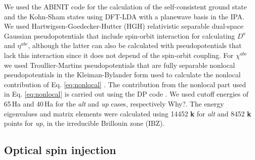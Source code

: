 \documentclass[pss]{wiley2sp} %
\begin{document}
We used the ABINIT code \cite{torrentCMS08} for the calculation of the self-consistent ground state and the Kohn-Sham states using DFT-LDA with a planewave basis in the IPA. We used Hartwigsen-Goedecker-Hutter (HGH) relativistic separable dual-space Gaussian pseudopotentials \cite{hartwigsenPRB98} that include spin-orbit interaction for calculating $D^{a}$ and {$\eta^{abc}$}, although the latter can also be calculated with pseudopotentials that lack this interaction since it does not depend of the spin-orbit coupling. For $\chi^{abc}$ we used Troullier-Martins pseudopotentials \cite{troullierPRB91} that are fully separable nonlocal pseudopotentials in the Kleiman-Bylander form used to calculate the nonlocal contribution of Eq. \eqref{eq:nonlocal} \cite{kleinmanPRL82}. The contribution from the nonlocal part used in Eq. \eqref{eq:nonlocal} is carried out using the DP code \cite{olevanoDP}. We used cutoff energies of 65\,Ha and 40\,Ha for the \emph{alt} and \emph{up} cases, respectively {\Large Why?}. The energy eigenvalues and matrix elements were calculated using 14452 \textbf{k} for \emph{alt} and 8452 \textbf{k} points for \emph{up}, in the irreducible Brillouin zone (IBZ).


\subsection{Optical spin injection}\label{subsec:results-DSP}
\end{document}
